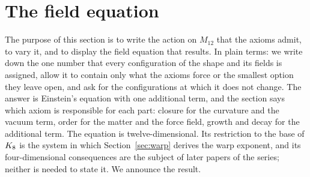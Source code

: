 
\section{The field equation}\label{sec:equation}

The purpose of this section is to write the action on $M_{12}$ that the
axioms admit, to vary it, and to display the field equation that results.
In plain terms: we write down the one number that every configuration of
the shape and its fields is assigned, allow it to contain only what the
axioms force or the smallest option they leave open, and ask for the
configurations at which it does not change. The answer is Einstein's
equation with one additional term, and the section says which axiom is
responsible for each part: closure for the curvature and the vacuum term,
order for the matter and the force field, growth and decay for the
additional term. The equation is twelve-dimensional. Its restriction to
the base of $K_8$ is the system in which Section~\ref{sec:warp} derives
the warp exponent, and its four-dimensional consequences are the subject
of later papers of the series; neither is needed to state it. We announce
the result.

